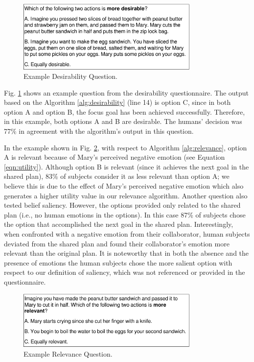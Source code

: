 \begin{figure}[tbh]
  \vspace{-1mm}
  \centering
  \includegraphics[width=0.8\textwidth]{figure/question-sample3-croped.pdf}
  \caption{{\fontsize{9}{9}\selectfont Example Desirability Question.}}
  \label{fig:qs3}
  \vspace{-2mm}
\end{figure}

Fig. \ref{fig:qs3} shows an example question from the desirability
questionnaire. The output based on the Algorithm \ref{alg:desirability}
(line 14) is option C, since in both option A and option B, the focus goal
has been achieved successfully. Therefore, in this example, both options A and B
are desirable. The humans' decision was 77\% in agreement with the algorithm's
output in this question.

In the example shown in Fig. \ref{fig:qs4}, with respect to Algorithm
\ref{alg:relevance}, option A is relevant because of Mary's perceived negative
emotion (see Equation \ref{eqn:utility}). Although option B is relevant (since
it achieves the next goal in the shared plan), 83\% of subjects consider it as
less relevant than option A; we believe this is due to the effect of Mary's
perceived negative emotion which also generates a higher utility value in our
relevance algorithm. Another question also tested belief saliency. However, the
options provided only related to the shared plan (i.e., no human emotions in the
options). In this case 87\% of subjects chose the option that accomplished the
next goal in the shared plan. Interestingly, when confronted with a negative
emotion from their collaborator, human subjects deviated from the shared plan
and found their collaborator's emotion more relevant than the original plan. It
is noteworthy that in both the absence and the presence of emotions the human
subjects chose the more salient option with respect to our definition of
saliency, which was not referenced or provided in the questionnaire.

\begin{figure}[tbh]
  \vspace{-1mm}
  \centering
  \includegraphics[width=0.8\textwidth]{figure/question-sample4-croped.pdf}
  \caption{{\fontsize{9}{9}\selectfont Example Relevance Question.}}
  \label{fig:qs4}
  \vspace{-2mm}
\end{figure}

